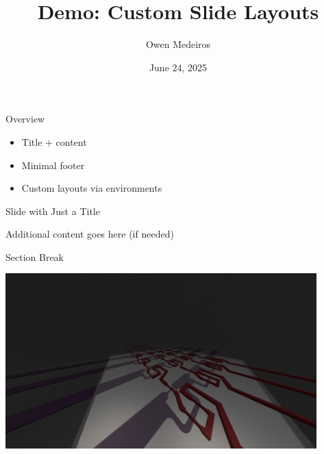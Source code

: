 \documentclass[aspectratio=169]{beamer}
\title{Demo: Custom Slide Layouts}
\author{Owen Medeiros}
\date{June 24, 2025}
\begin{document}
\begin{SlideTitleSlide}
\end{SlideTitleSlide}


\begin{SlideTitleContent}{Overview}
  \begin{itemize}
    \item Title + content
    \item Minimal footer
    \item Custom layouts via environments
  \end{itemize}
\end{SlideTitleContent}

\begin{SlideTitleOnly}{Slide with Just a Title}
  \begin{center}
    \Large Additional content goes here (if needed)
  \end{center}
\end{SlideTitleOnly}

\begin{SlideTitleCentered}{Section Break}
\end{SlideTitleCentered}

\begin{SlideImageOnly}
  \includegraphics[width=0.9\textwidth]{example_image.png}  %
\end{SlideImageOnly}
\end{document}

